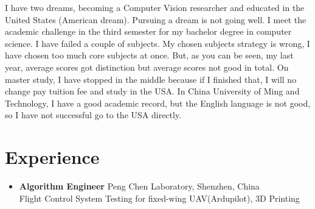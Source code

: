 \documentclass[]{friggeri-cv}
\renewenvironment{entrylist}{%
  \begin{itemize}[leftmargin=1in]%
  }{%
  \end{itemize}
}
\renewcommand{\entry}[4]{%
\item[#1]
  \textbf{#2}%
  \hfill%
  {\footnotesize\addfontfeature{Color=myblue} #3}\\%
  #4\vspace{\parsep}%
}
\begin{document}
I have two dreams, becoming a Computer Vision researcher and educated in the
United States (American dream).  Pursuing a dream is not going well. I meet the
academic challenge in the third semester for my bachelor degree
in computer science. I have failed a couple of subjects. My chosen subjects
strategy is wrong, I have chosen too much core subjects at once. But, as you can
be seen, my last year, average scores got distinction but average scores not
good in total. On master study, I have stopped in the middle because if I
finished that, I will no change pay tuition fee and study in the USA. In China
University of Ming and Technology, I have a good academic record, but the
English language is not good, so I have not successful go to the USA directly.

\section{Experience}
\begin{entrylist}
  \entry
  {2018.12 - Now\\}
  {\large{Algorithm Engineer}}
  {Peng Chen Laboratory, Shenzhen, China}
  {Flight Control System Testing for fixed-wing UAV(Ardupilot), 3D Printing}

\end{entrylist}
\end{document}
